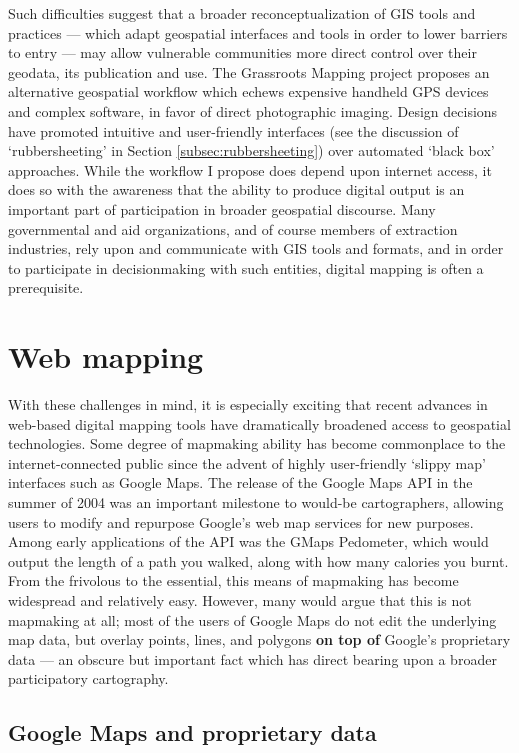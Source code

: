\documentclass[11pt,oneside,notitlepage]{report}
\begin{document}
{{Such difficulties suggest that a broader reconceptualization of GIS tools and practices --- which adapt geospatial interfaces and tools in order to lower barriers to entry --- may allow vulnerable communities more direct control over their geodata, its publication and use. The Grassroots Mapping project proposes an alternative geospatial workflow which echews expensive handheld GPS devices and complex software, in favor of direct photographic imaging. Design decisions have promoted intuitive and user-friendly interfaces (see the discussion of `rubbersheeting' in Section \ref{subsec:rubbersheeting}) over automated `black box' approaches. While the workflow I propose does depend upon internet access, it does so with the awareness that the ability to produce digital output is an important part of participation in broader geospatial discourse. Many governmental and aid organizations, and of course members of extraction industries, rely upon and communicate with GIS tools and formats, and in order to participate in decisionmaking with such entities, digital mapping is often a prerequisite. 

\section{Web mapping}
\label{sec:webmapping}

With these challenges in mind, it is especially exciting that recent advances in web-based digital mapping tools have dramatically broadened access to geospatial technologies. Some degree of mapmaking ability has become commonplace to the internet-connected public since the advent of highly user-friendly `slippy map' interfaces such as Google Maps. The release of the Google Maps \ac{API} in the summer of 2004 was an important milestone to would-be cartographers, allowing users to modify and repurpose Google's web map services for new purposes. Among early applications of the \ac{API} was the GMaps Pedometer, which would output the length of a path you walked, along with how many calories you burnt. \cite{gibson2006google} From the frivolous to the essential, this means of mapmaking has become widespread and relatively easy. However, many would argue that this is not mapmaking at all; most of the users of Google Maps do not edit the underlying map data, but overlay points, lines, and polygons \textbf{on top of} Google's proprietary data --- an obscure but important fact which has direct bearing upon a broader participatory cartography. 

\subsection{Google Maps and proprietary data}

}}
\end{document}
